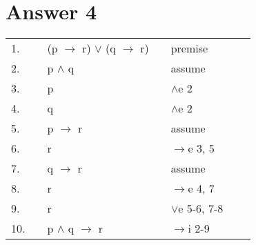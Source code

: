 \documentclass[12pt]{article}
\begin{document}
\section*{Answer 4}
\begin{table}[H]
\centering
\begin{tabular}{|lllllll|}
\hline
1.                       &                       & (p $\rightarrow$ r) $\lor$ (q $\rightarrow$ r) &  & premise                                  &                       &  \\ \cline{2-6}
\multicolumn{1}{|l|}{2.} &                       & p $\land$ q                                    &  & assume                                   & \multicolumn{1}{l|}{} &  \\
\multicolumn{1}{|l|}{3.} &                       & p                                              &  & $\land$e 2                               & \multicolumn{1}{l|}{} &  \\
\multicolumn{1}{|l|}{4.} &                       & q                                              &  & $\land$e 2                               & \multicolumn{1}{l|}{} &  \\ \cline{3-5}
\multicolumn{1}{|l|}{5.} & \multicolumn{1}{l|}{} & p $\rightarrow$ r                              &  & \multicolumn{1}{l|}{assume}              & \multicolumn{1}{l|}{} &  \\
\multicolumn{1}{|l|}{6.} & \multicolumn{1}{l|}{} & r                                              &  & \multicolumn{1}{l|}{$\rightarrow$e 3, 5} & \multicolumn{1}{l|}{} &  \\ \cline{3-5}
\multicolumn{1}{|l|}{7.} & \multicolumn{1}{l|}{} & q $\rightarrow$ r                              &  & \multicolumn{1}{l|}{assume}              & \multicolumn{1}{l|}{} &  \\
\multicolumn{1}{|l|}{8.} & \multicolumn{1}{l|}{} & r                                              &  & \multicolumn{1}{l|}{$\rightarrow$e 4, 7} & \multicolumn{1}{l|}{} &  \\ \cline{3-5}
\multicolumn{1}{|l|}{9.} &                       & r                                              &  & $\lor$e 5-6, 7-8                         & \multicolumn{1}{l|}{} &  \\ \cline{2-6}
10.                      &                       & p $\land$ q $\rightarrow$ r                    &  & $\rightarrow$i 2-9                       &                       &  \\ \hline
\end{tabular}
\end{table}
\end{document}
